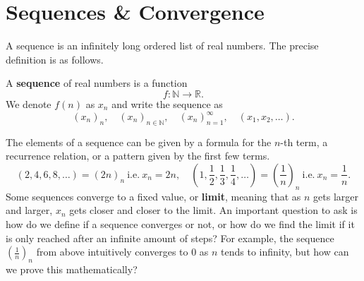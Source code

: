 \documentclass[../real_analysis.tex]{subfiles}
\begin{document}
    \section{Sequences \& Convergence}
        A sequence is an infinitely long ordered list of real numbers. The precise definition is as follows.
        \begin{definition}
            A \textbf{sequence} of real numbers is a function
            \[f:\mathbb{N}\to\mathbb{R}.\]
            We denote $f(n)$ as $x_n$ and write the sequence as
            \[(x_n)_n,\quad(x_n)_{n\in\mathbb{N}},\quad(x_n)_{n=1}^\infty,\quad(x_1,x_2,\dots).\]
        \end{definition}
        The elements of a sequence can be given by a formula for the $n$-th term, a recurrence relation, or a pattern given by the first few terms.
        \begin{equation}
            (2,4,6,8,\dots)=(2n)_n\ \mathrm{i.e.}\ x_n=2n,\quad\left(1,\frac{1}{2},\frac{1}{3},\frac{1}{4},\dots\right)=\left(\frac{1}{n}\right)_n\ \mathrm{i.e.}\ x_n=\frac{1}{n}.
        \end{equation}
        Some sequences converge to a fixed value, or \textbf{limit}, meaning that as $n$ gets larger and larger, $x_n$ gets closer and closer to the limit. An important question to ask is how do we define if a sequence converges or not, or how do we find the limit if it is only reached after an infinite amount of steps? For example, the sequence $\left(\frac{1}{n}\right)_n$ from above intuitively converges to 0 as $n$ tends to infinity, but how can we prove this mathematically?
\end{document}
